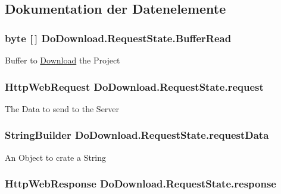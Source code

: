 \subsection{Dokumentation der Datenelemente}
\hypertarget{class_do_download_1_1_request_state_aca28c955c588bc3d14b930bd281a7eb8}{
\subsubsection[{Buffer\-Read}]{\setlength{\rightskip}{0pt plus 5cm}byte \mbox{[}$\,$\mbox{]} Do\-Download.\-Request\-State.\-Buffer\-Read}}\label{class_do_download_1_1_request_state_aca28c955c588bc3d14b930bd281a7eb8}
Buffer to \hyperlink{namespace_download}{Download} the Project \hypertarget{class_do_download_1_1_request_state_a407f724ed70036cffecc6d595e70b3eb}{
\subsubsection[{request}]{\setlength{\rightskip}{0pt plus 5cm}Http\-Web\-Request Do\-Download.\-Request\-State.\-request}}\label{class_do_download_1_1_request_state_a407f724ed70036cffecc6d595e70b3eb}
The Data to send to the Server \hypertarget{class_do_download_1_1_request_state_af0c123367214a73fda316c1e53f35c9b}{
\subsubsection[{request\-Data}]{\setlength{\rightskip}{0pt plus 5cm}String\-Builder Do\-Download.\-Request\-State.\-request\-Data}}\label{class_do_download_1_1_request_state_af0c123367214a73fda316c1e53f35c9b}
An Object to crate a String \hypertarget{class_do_download_1_1_request_state_a92511d66202e453392c09341c2f5a3c6}{
\subsubsection[{response}]{\setlength{\rightskip}{0pt plus 5cm}Http\-Web\-Response Do\-Download.\-Request\-State.\-response}}\label{class_do_download_1_1_request_state_a92511d66202e453392c09341c2f5a3c6}

